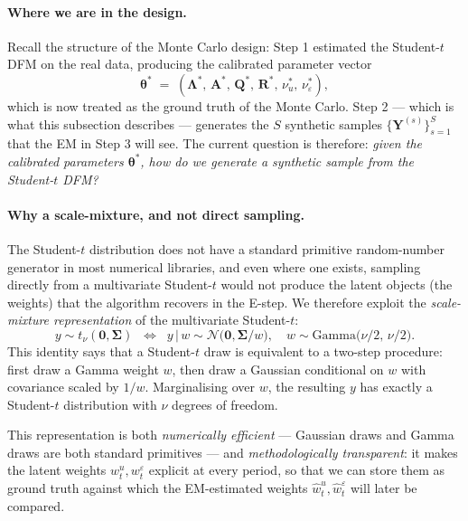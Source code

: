 \documentclass[11pt, a4paper, oneside]{article}
\newcommand{\mY}{\mathbf{Y}}
\newcommand{\mL}{\boldsymbol{\Lambda}}
\newcommand{\mA}{\mathbf{A}}
\newcommand{\mR}{\mathbf{R}}
\newcommand{\mQ}{\mathbf{Q}}
\newcommand{\btheta}{\boldsymbol{\theta}}
\begin{document}
\paragraph{Where we are in the design.}
Recall the structure of the Monte Carlo design: Step 1 estimated
the Student-$t$ DFM on the real data, producing the calibrated
parameter vector
\[
\btheta^* \;=\; (\mL^*,\, \mA^*,\, \mQ^*,\, \mR^*,\, \nu_u^*,\, \nu_\varepsilon^*),
\]
which is now treated as the ground truth of the Monte Carlo. Step 2
— which is what this subsection describes — generates the $S$
synthetic samples $\{\mY^{(s)}\}_{s=1}^{S}$ that the EM in Step 3
will see. The current question is therefore: \emph{given the
calibrated parameters $\btheta^*$, how do we generate a synthetic
sample from the Student-$t$ DFM?}

\paragraph{Why a scale-mixture, and not direct sampling.}
The Student-$t$ distribution does not have a standard primitive
random-number generator in most numerical libraries, and even where
one exists, sampling directly from a multivariate Student-$t$ would
not produce the latent objects (the weights) that the algorithm
recovers in the E-step. We therefore exploit the
\emph{scale-mixture representation} of the multivariate Student-$t$:
\[
y \sim t_{\nu}(\mathbf{0}, \boldsymbol{\Sigma})
\;\;\Longleftrightarrow\;\;
y \,\big|\, w \sim \mathcal{N}\!\big(\mathbf{0}, \boldsymbol{\Sigma}/w\big),
\quad
w \sim \mathrm{Gamma}\!\big(\nu/2,\, \nu/2\big).
\]
This identity says that a Student-$t$ draw is equivalent to a
two-step procedure: first draw a Gamma weight $w$, then draw a
Gaussian conditional on $w$ with covariance scaled by $1/w$.
Marginalising over $w$, the resulting $y$ has exactly a
Student-$t$ distribution with $\nu$ degrees of freedom.

This representation is both \emph{numerically efficient} — Gaussian
draws and Gamma draws are both standard primitives — and
\emph{methodologically transparent}: it makes the latent weights
$w_t^u, w_t^\varepsilon$ explicit at every period, so that we can
store them as ground truth against which the EM-estimated weights
$\hat{w}_t^u, \hat{w}_t^\varepsilon$ will later be compared.
\end{document}
